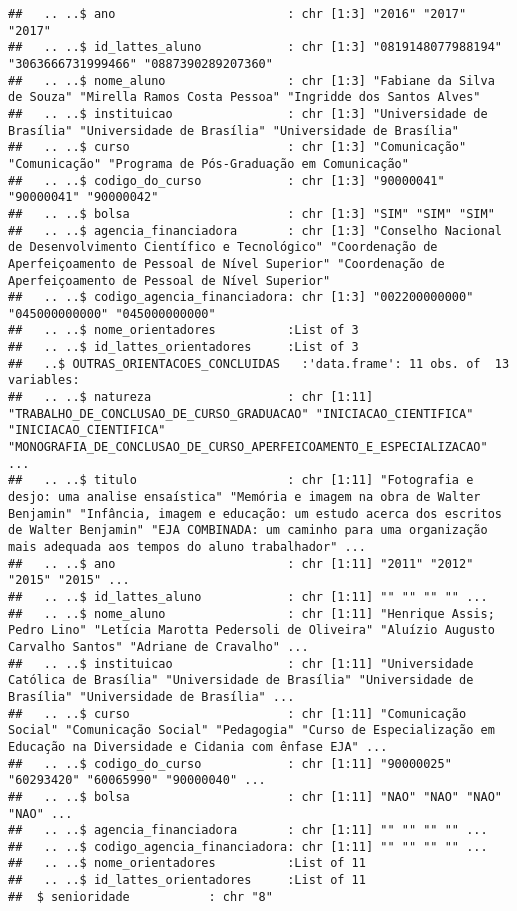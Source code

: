 \documentclass[]{article}
\begin{document}
\begin{verbatim}
##   .. ..$ ano                        : chr [1:3] "2016" "2017" "2017"
##   .. ..$ id_lattes_aluno            : chr [1:3] "0819148077988194" "3063666731999466" "0887390289207360"
##   .. ..$ nome_aluno                 : chr [1:3] "Fabiane da Silva de Souza" "Mirella Ramos Costa Pessoa" "Ingridde dos Santos Alves"
##   .. ..$ instituicao                : chr [1:3] "Universidade de Brasília" "Universidade de Brasília" "Universidade de Brasília"
##   .. ..$ curso                      : chr [1:3] "Comunicação" "Comunicação" "Programa de Pós-Graduação em Comunicação"
##   .. ..$ codigo_do_curso            : chr [1:3] "90000041" "90000041" "90000042"
##   .. ..$ bolsa                      : chr [1:3] "SIM" "SIM" "SIM"
##   .. ..$ agencia_financiadora       : chr [1:3] "Conselho Nacional de Desenvolvimento Científico e Tecnológico" "Coordenação de Aperfeiçoamento de Pessoal de Nível Superior" "Coordenação de Aperfeiçoamento de Pessoal de Nível Superior"
##   .. ..$ codigo_agencia_financiadora: chr [1:3] "002200000000" "045000000000" "045000000000"
##   .. ..$ nome_orientadores          :List of 3
##   .. ..$ id_lattes_orientadores     :List of 3
##   ..$ OUTRAS_ORIENTACOES_CONCLUIDAS   :'data.frame': 11 obs. of  13 variables:
##   .. ..$ natureza                   : chr [1:11] "TRABALHO_DE_CONCLUSAO_DE_CURSO_GRADUACAO" "INICIACAO_CIENTIFICA" "INICIACAO_CIENTIFICA" "MONOGRAFIA_DE_CONCLUSAO_DE_CURSO_APERFEICOAMENTO_E_ESPECIALIZACAO" ...
##   .. ..$ titulo                     : chr [1:11] "Fotografia e desjo: uma analise ensaística" "Memória e imagem na obra de Walter Benjamin" "Infância, imagem e educação: um estudo acerca dos escritos de Walter Benjamin" "EJA COMBINADA: um caminho para uma organização mais adequada aos tempos do aluno trabalhador" ...
##   .. ..$ ano                        : chr [1:11] "2011" "2012" "2015" "2015" ...
##   .. ..$ id_lattes_aluno            : chr [1:11] "" "" "" "" ...
##   .. ..$ nome_aluno                 : chr [1:11] "Henrique Assis; Pedro Lino" "Letícia Marotta Pedersoli de Oliveira" "Aluízio Augusto Carvalho Santos" "Adriane de Cravalho" ...
##   .. ..$ instituicao                : chr [1:11] "Universidade Católica de Brasília" "Universidade de Brasília" "Universidade de Brasília" "Universidade de Brasília" ...
##   .. ..$ curso                      : chr [1:11] "Comunicação Social" "Comunicação Social" "Pedagogia" "Curso de Especialização em Educação na Diversidade e Cidania com ênfase EJA" ...
##   .. ..$ codigo_do_curso            : chr [1:11] "90000025" "60293420" "60065990" "90000040" ...
##   .. ..$ bolsa                      : chr [1:11] "NAO" "NAO" "NAO" "NAO" ...
##   .. ..$ agencia_financiadora       : chr [1:11] "" "" "" "" ...
##   .. ..$ codigo_agencia_financiadora: chr [1:11] "" "" "" "" ...
##   .. ..$ nome_orientadores          :List of 11
##   .. ..$ id_lattes_orientadores     :List of 11
##  $ senioridade           : chr "8"
\end{verbatim}
\end{document}
